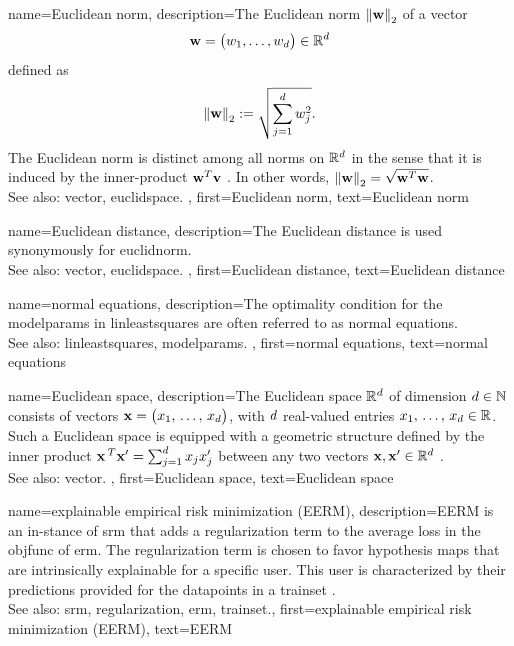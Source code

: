 {name={Euclidean norm}, 
	description={The 
		Euclidean norm $\left\Vert {{\bf w}} \right\Vert_{2}$ of a \gls{vector} 
		$${\bf w} = \big(w_{1},\ldots,w_{d} \big) \in
		\mathbb{R}^{d}$$
		defined as 
		$$\left\Vert {{\bf w}} \right\Vert_{2} := \sqrt{\sum_{j=1}^{d}w^2_{j}}.$$ 
		The Euclidean norm is distinct among all norms on $\mathbb{R}^{d}$ in the sense 
		that it is induced by the inner-product ${\bf w}^{T} {\bf v}$ \cite{RudinBook,HalmosFiniteDimVecSpace,BoydConvexBook}. 
		In other words, $\left\Vert {{\bf w}} \right\Vert_{2}= \sqrt{{\bf w}^{T} {\bf w}}$.	\\
		See also: \gls{vector}, \gls{euclidspace}. },
	first={Euclidean norm},
	text={Euclidean norm} 
}

{name={Euclidean distance}, 
	description={The Euclidean distance is used 
	synonymously for \gls{euclidnorm}.	\\
	See also: \gls{vector}, \gls{euclidspace}. },
	first={Euclidean distance},
	text={Euclidean distance} 
}

{name={normal equations}, 
	description={The optimality condition for the \gls{modelparams} 
	in \gls{linleastsquares} are often referred to as normal equations.\\ 
	See also: \gls{linleastsquares}, \gls{modelparams}. 
	},
	first={normal equations},
	text={normal equations} 
}


{name={Euclidean space}, 
	description={The 
		Euclidean space $\mathbb{R}^{d}$ of dimension $d \in \mathbb{N}$ consists 
		of \glspl{vector} ${\bf x}= \big(x_{1}, \,\ldots, \,x_{d}\big)$, with $d$ 
		real-valued entries $x_{1}, \,\ldots, \,x_{d} \in \mathbb{R}$. Such a Euclidean 
		space is equipped with a geometric structure defined by the inner product 
		${\bf x}\,^{T} {\bf x}' = \sum_{j=1}^{d} x_{j} x'_{j}$ 
		between any two \glspl{vector} ${\bf x},{\bf x}' \in \mathbb{R}^{d}$ \cite{RudinBookPrinciplesMatheAnalysis}.
		\\
		See also: \gls{vector}. },
	first={Euclidean space},
	text={Euclidean space} 
}

{name={explainable empirical risk minimization (EERM)}, 
	description={EERM is an 
		in-\linebreak stance of \gls{srm} that adds a \gls{regularization} term to the 
		average \gls{loss} in the \gls{objfunc} of \gls{erm}. 
		The \gls{regularization} term is chosen to favor \gls{hypothesis} \glspl{map} that are intrinsically 
		explainable for a specific user. This user is characterized by their \glspl{prediction} provided 
		for the \glspl{datapoint} in a \gls{trainset} \cite{Zhang:2024aa}.
				\\
		See also: \gls{srm}, \gls{regularization}, \gls{erm}, \gls{trainset}.},
	first={explainable empirical risk minimization (EERM)},
	text={EERM} 
}
	
